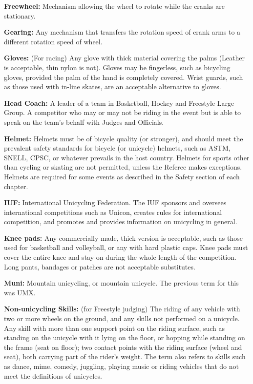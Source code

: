 \textbf{Freewheel:} Mechanism allowing the wheel to rotate while the cranks are stationary.

\textbf{Gearing:} Any mechanism that transfers the rotation speed of crank arms to a different rotation speed of wheel.

\textbf{Gloves:} (For racing) Any glove with thick material covering the palms (Leather is acceptable, thin nylon is not).
Gloves may be fingerless, such as bicycling gloves, provided the palm of the hand is completely covered.
Wrist guards, such as those used with in-line skates, are an acceptable alternative to gloves.

\textbf{Head Coach:} A leader of a team in Basketball, Hockey and Freestyle Large Group.
A competitor who may or may not be riding in the event but is able to speak on the team’s behalf with Judges and Officials.

\textbf{Helmet:} Helmets must be of bicycle quality (or stronger), and should meet the prevalent safety standards for bicycle (or unicycle) helmets, such as ASTM, SNELL, CPSC, or whatever prevails in the host country.
Helmets for sports other than cycling or skating are not permitted, unless the Referee makes exceptions.
Helmets are required for some events as described in the Safety section of each chapter.

\textbf{IUF:} International Unicycling Federation.
The IUF sponsors and oversees international competitions such as Unicon, creates rules for international competition, and promotes and provides information on unicycling in general.

\textbf{Knee pads:} Any commercially made, thick version is acceptable, such as those used for basketball and volleyball, or any with hard plastic caps.
Knee pads must cover the entire knee and stay on during the whole length of the competition.
Long pants, bandages or patches are not acceptable substitutes.

\textbf{Muni:} Mountain unicycling, or mountain unicycle.
The previous term for this was UMX.

\textbf{Non-unicycling Skills:} (for Freestyle judging) The riding of any vehicle with two or more wheels on the ground, and any skills not performed on a unicycle.
Any skill with more than one support point on the riding surface, such as standing on the unicycle with it lying on the floor, or hopping while standing on the frame (seat on floor); two contact points with the riding surface (wheel and seat), both carrying part of the rider's weight.
The term also refers to skills such as dance, mime, comedy, juggling, playing music or riding vehicles that do not meet the definitions of unicycles.

